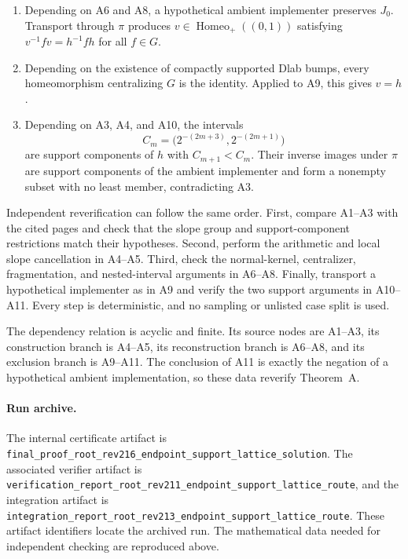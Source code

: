 \documentclass[11pt]{amsart}
\theoremstyle{definition}
\theoremstyle{remark}
\numberwithin{equation}{section}
\begin{document}
\begin{enumerate}
\item[\textup{A9}.] Depending on A6 and A8, a hypothetical ambient implementer preserves \(J_0\). Transport through \(\pi\) produces \(v\in\operatorname{Homeo}_+((0,1))\) satisfying \(v^{-1}fv=h^{-1}fh\) for all \(f\in G\).

\item[\textup{A10}.] Depending on the existence of compactly supported Dlab bumps, every homeomorphism centralizing \(G\) is the identity. Applied to A9, this gives \(v=h\).

\item[\textup{A11}.] Depending on A3, A4, and A10, the intervals
\[
C_m=\bigl(2^{-(2m+3)},2^{-(2m+1)}\bigr)
\]
are support components of \(h\) with \(C_{m+1}<C_m\). Their inverse images under \(\pi\) are support components of the ambient implementer and form a nonempty subset with no least member, contradicting A3.
\end{enumerate}

Independent reverification can follow the same order. First, compare A1--A3 with the cited pages and check that the slope group and support-component restrictions match their hypotheses. Second, perform the arithmetic and local slope cancellation in A4--A5. Third, check the normal-kernel, centralizer, fragmentation, and nested-interval arguments in A6--A8. Finally, transport a hypothetical implementer as in A9 and verify the two support arguments in A10--A11. Every step is deterministic, and no sampling or unlisted case split is used.

The dependency relation is acyclic and finite. Its source nodes are A1--A3, its construction branch is A4--A5, its reconstruction branch is A6--A8, and its exclusion branch is A9--A11. The conclusion of A11 is exactly the negation of a hypothetical ambient implementation, so these data reverify Theorem~A.

\paragraph{Run archive.}
The internal certificate artifact is \nolinkurl{final_proof_root_rev216_endpoint_support_lattice_solution}. The associated verifier artifact is \nolinkurl{verification_report_root_rev211_endpoint_support_lattice_route}, and the integration artifact is \nolinkurl{integration_report_root_rev213_endpoint_support_lattice_route}. These artifact identifiers locate the archived run. The mathematical data needed for independent checking are reproduced above.
\end{document}
